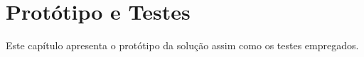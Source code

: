 \chapter{Protótipo e Testes}

Este capítulo apresenta o protótipo da solução assim como os testes empregados.
